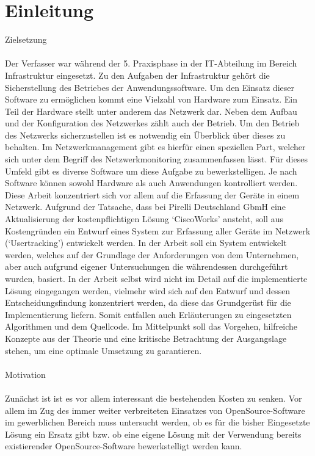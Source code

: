 \chapter{Einleitung}
\label{cha:Einleitung}

Zielsetzung\\
\\
Der Verfasser war während der 5. Praxisphase in der IT-Abteilung im Bereich Infrastruktur eingesetzt.
Zu den Aufgaben der Infrastruktur gehört die Sicherstellung des Betriebes der Anwendungssoftware. Um den Einsatz dieser Software zu ermöglichen kommt eine Vielzahl von Hardware zum Einsatz. Ein Teil der Hardware stellt unter anderem das Netzwerk dar. Neben dem Aufbau und der Konfiguration des Netzwerkes zählt auch der Betrieb. Um den Betrieb des Netzwerks sicherzustellen ist es notwendig ein Überblick über dieses zu behalten.
Im Netzwerkmanagement gibt es hierfür einen speziellen Part, welcher sich unter dem Begriff des Netzwerkmonitoring zusammenfassen lässt. Für dieses Umfeld gibt es diverse Software um diese Aufgabe zu bewerkstelligen. Je nach Software können sowohl Hardware als auch Anwendungen kontrolliert werden. Diese Arbeit konzentriert sich vor allem auf die Erfassung der Geräte in einem Netzwerk. Aufgrund der Tatsache, dass bei Pirelli Deutschland GbmH eine Aktualisierung der kostenpflichtigen Lösung ‘CiscoWorks’ ansteht, soll aus Kostengründen ein Entwurf eines System zur Erfassung aller Geräte im Netzwerk (‘Usertracking’) entwickelt werden. In der Arbeit soll ein System entwickelt werden, welches auf der Grundlage der Anforderungen von dem Unternehmen, aber auch aufgrund eigener Untersuchungen die währendessen durchgeführt wurden, basiert. In der Arbeit selbst wird nicht im Detail auf die implementierte Lösung eingegangen werden, vielmehr wird sich auf den Entwurf und dessen Entscheidungsfindung konzentriert werden, da diese das Grundgerüst für die Implementierung liefern. Somit entfallen auch Erläuterungen zu eingesetzten Algorithmen und dem Quellcode.
Im Mittelpunkt soll das Vorgehen, hilfreiche Konzepte aus der Theorie und eine kritische Betrachtung der Ausgangslage stehen, um eine optimale Umsetzung zu garantieren.\\
\\
Motivation\\
\\
Zunächst ist ist es vor allem interessant die bestehenden Kosten zu senken. Vor allem im Zug des immer weiter verbreiteten Einsatzes von OpenSource-Software im gewerblichen Bereich muss untersucht werden, ob es für die bisher Eingesetzte Lösung ein Ersatz gibt bzw. ob eine eigene Lösung mit der Verwendung bereits existierender OpenSource-Software bewerkstelligt werden kann.
